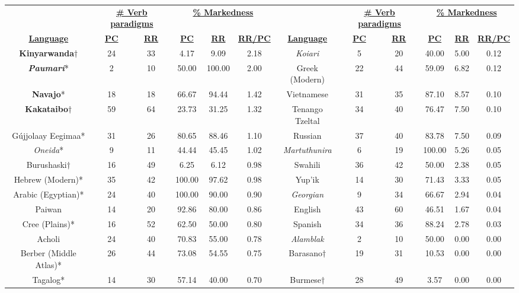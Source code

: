 \begin{tabular}{cccccccccccc}
 & \multicolumn{2}{c}{\underline{\textbf{\# Verb paradigms}}} & \multicolumn{3}{c}{\underline{\textbf{\% Markedness}}} & & \multicolumn{2}{c}{\underline{\textbf{\# Verb paradigms}}} & \multicolumn{3}{c}{\underline{\textbf{\% Markedness}}} \\
\underline{\textbf{Language}} & \underline{\textbf{PC}} & \underline{\textbf{RR}} & \underline{\textbf{PC}} & \underline{\textbf{RR}} & \underline{\textbf{RR/PC}} & \underline{\textbf{Language}} & \underline{\textbf{PC}} & \underline{\textbf{RR}} & \underline{\textbf{PC}} & \underline{\textbf{RR}} & \underline{\textbf{RR/PC}} \\
\textbf{Kinyarwanda}$\dagger$ & 24 & 33 & 4.17 & 9.09 & 2.18 & \emph{Koiari} & 5 & 20 & 40.00 & 5.00 & 0.12 \\
\emph{\textbf{Paumarí}}* & 2 & 10 & 50.00 & 100.00 & 2.00 & Greek (Modern) & 22 & 44 & 59.09 & 6.82 & 0.12 \\
\textbf{Navajo}* & 18 & 18 & 66.67 & 94.44 & 1.42 & Vietnamese & 31 & 35 & 87.10 & 8.57 & 0.10 \\
\textbf{Kakataibo}$\dagger$ & 59 & 64 & 23.73 & 31.25 & 1.32 & Tenango Tzeltal & 34 & 40 & 76.47 & 7.50 & 0.10 \\
Gújjolaay Eegimaa* & 31 & 26 & 80.65 & 88.46 & 1.10 & Russian & 37 & 40 & 83.78 & 7.50 & 0.09 \\
\emph{Oneida}* & 9 & 11 & 44.44 & 45.45 & 1.02 & \emph{Martuthunira} & 6 & 19 & 100.00 & 5.26 & 0.05 \\
Burushaski$\dagger$ & 16 & 49 & 6.25 & 6.12 & 0.98 & Swahili & 36 & 42 & 50.00 & 2.38 & 0.05 \\
Hebrew (Modern)* & 35 & 42 & 100.00 & 97.62 & 0.98 & Yup'ik & 14 & 30 & 71.43 & 3.33 & 0.05 \\
Arabic (Egyptian)* & 24 & 40 & 100.00 & 90.00 & 0.90 & \emph{Georgian} & 9 & 34 & 66.67 & 2.94 & 0.04 \\
Paiwan & 14 & 20 & 92.86 & 80.00 & 0.86 & English & 43 & 60 & 46.51 & 1.67 & 0.04 \\
Cree (Plains)* & 16 & 52 & 62.50 & 50.00 & 0.80 & Spanish & 34 & 36 & 88.24 & 2.78 & 0.03 \\
Acholi & 24 & 40 & 70.83 & 55.00 & 0.78 & \emph{Alamblak} & 2 & 10 & 50.00 & 0.00 & 0.00 \\
Berber (Middle Atlas)* & 26 & 44 & 73.08 & 54.55 & 0.75 & Barasano$\dagger$ & 19 & 31 & 10.53 & 0.00 & 0.00 \\
Tagalog* & 14 & 30 & 57.14 & 40.00 & 0.70 & Burmese$\dagger$ & 28 & 49 & 3.57 & 0.00 & 0.00 \\

\end{tabular}
